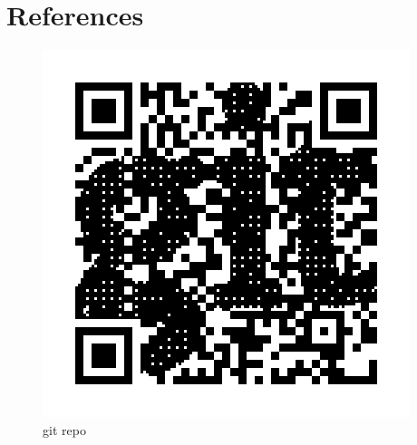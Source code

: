 \documentclass{beamer}
\begin{document}
\section{References}
\begin{frame}
    \begin{figure}
        \includegraphics[width=\0.9\textwidth]{img/git_qr.png}
        \caption{git repo}
    \end{figure}
\end{frame}
\end{document}
